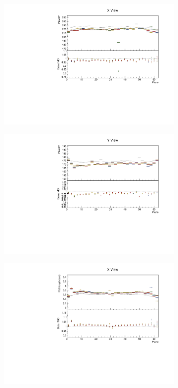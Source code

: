 \documentclass[12pt,a4paper]{article}
\begin{document}
\begin{figure}[!ht]
\begin{subfigure}{0.5\textwidth}
  \end{subfigure}
  \begin{subfigure}{0.5\textwidth}
    \includegraphics[width=\linewidth]{essentialsec_tb/pecorr_plane_x.pdf}
  \end{subfigure}
  \begin{subfigure}{0.5\textwidth}
    \includegraphics[width=\linewidth]{essentialsec_tb/pecorr_plane_y.pdf}
  \end{subfigure}
  \begin{subfigure}{0.5\textwidth}
    \includegraphics[width=\linewidth]{essentialsec_tb/cm_plane_x.pdf}

\end{subfigure}
\end{figure}
\end{document}
